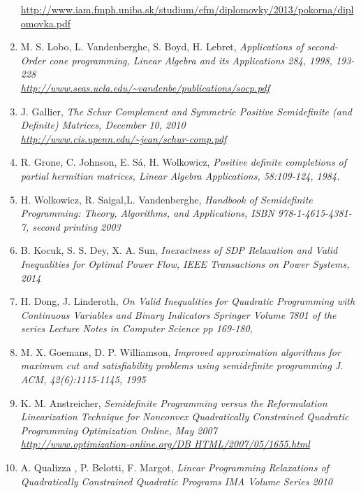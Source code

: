 \documentclass[12pt]{book}
\theoremstyle{definition}
\begin{document}
\begin{enumerate}
\url{http://www.iam.fmph.uniba.sk/studium/efm/diplomovky/2013/pokorna/diplomovka.pdf}
\label{PokornaSOCPDipl}
%
\item M. S. Lobo, L. Vandenberghe, S. Boyd, H. Lebret, \it Applications of second-Order cone programming, \rm Linear Algebra and its Applications 284, 1998, 193-228\\
\url{http://www.seas.ucla.edu/~vandenbe/publications/socp.pdf}
\label{LoboVandApplicationsofSOCP}
%
\item J. Gallier, \it The Schur Complement and Symmetric Positive Semidefinite (and Definite) Matrices, \rm December 10, 2010 \\
\url{http://www.cis.upenn.edu/~jean/schur-comp.pdf}
\label{GallierSchurCompl}
%
\item R. Grone, C. Johnson, E. Sá, H. Wolkowicz, \it Positive definite completions of partial hermitian matrices, \rm 
Linear Algebra Applications, 58:109-124, 1984.
\label{GronePSDcompletions}
%
\item H. Wolkowicz, R. Saigal,L. Vandenberghe, \it Handbook of Semidefinite Programming: Theory, Algorithms, and Applications, \rm
ISBN 978-1-4615-4381-7, second printing 2003
\label{HandbookSDP}
%
\item B. Kocuk, S. S. Dey, X. A. Sun, \it Inexactness of SDP Relaxation and Valid Inequalities for Optimal Power Flow, \rm
IEEE Transactions on Power Systems, 2014
\label{InexactSDPandValidIneq}
%
\item H. Dong, J. Linderoth, \it On Valid Inequalities for Quadratic Programming with Continuous Variables and Binary Indicators \rm
Springer Volume 7801 of the series Lecture Notes in Computer Science pp 169-180,
\label{onValidIneqforQP}
%
\item M. X. Goemans, D. P. Williamson, \it Improved approximation algorithms for maximum cut and satisfiability problems using semidefinite programming \rm J. ACM, 42(6):1115-1145, 1995
\label{GoemansWilliamsonMaxCut}
%
\item K. M. Anstreicher, \it Semidefinite Programming versus the Reformulation Linearization Technique for Nonconvex Quadratically Constrained Quadratic Programming \rm Optimization Online, May 2007\\
\url{http://www.optimization-online.org/DB HTML/2007/05/1655.html}
\label{AnstreicherSDPvsRLT}
%
\item A. Qualizza , P. Belotti, F. Margot, \it Linear Programming Relaxations of Quadratically Constrained Quadratic Programs \rm 
IMA Volume Series 2010 \\

\end{enumerate}
\end{document}
